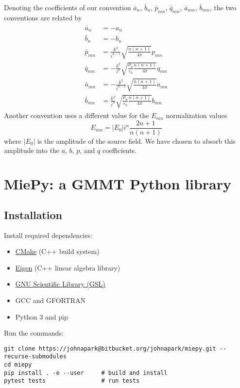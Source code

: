 \documentclass[11pt]{article}
\begin{document}
Denoting the coefficients of our convention $\bar a_n$, $\bar b_n$, $\bar p_{mn}$, $\bar q_{mn}$, $\bar a_{mn}$, $\bar b_{mn}$, the two conventions are related by
\begin{align}
\begin{split}
    \bar a_{n} &= - a_{n} \\
    \bar b_{n} &= - b_{n} \\
    \bar p_{mn} &= \frac{k^2}{i^{n-1}}\sqrt{\frac{n(n+1)}{4\pi}} p_{mn} \\
    \bar q_{mn} &= -\frac{k^2}{i^n}\sqrt{\frac{\mu_b}{\varepsilon_b} \frac{n(n+1)}{4\pi}} q_{mn} \\
    \bar a_{mn} &= -\frac{k^2}{i^{n-1}}\sqrt{\frac{n(n+1)}{4\pi}} a_{mn} \\
    \bar b_{mn} &= \frac{k^2}{i^n}\sqrt{\frac{\mu_b}{\varepsilon_b} \frac{n(n+1)}{4\pi}} b_{mn}
\end{split}
\end{align}
Another convention uses a different value for the $E_{mn}$ normalization values \cite{xu1995electromagnetic}
\begin{equation}
    E_{mn} = |E_0|i^n \frac{2n+1}{n(n+1)}
\end{equation}
where $|E_0|$ is the amplitude of the source field.
We have chosen to absorb this amplitude into the $a$, $b$, $p$, and $q$ coefficients.

\section{MiePy: a GMMT Python library}

\subsection{Installation}
\noindent
Install required dependencies:
\begin{itemize}[label={\tiny\raisebox{1ex}{\textbullet}}]
    \item \href{https://cmake.org/install/}{CMake} (C++ build system)
    \item \href{http://eigen.tuxfamily.org/index.php?title=Main_Page}{Eigen} (C++ linear algebra library)
    \item \href{https://www.gnu.org/software/gsl/}{GNU Scientific Library (GSL)}
\item GCC and GFORTRAN
\item Python 3 and pip
\end{itemize}
Run the commands:
\begin{lstlisting}
git clone https://johnapark@bitbucket.org/johnapark/miepy.git --recurse-submodules
cd miepy
pip install . -e --user     # build and install
pytest tests                # run tests
\end{lstlisting}
\end{document}

